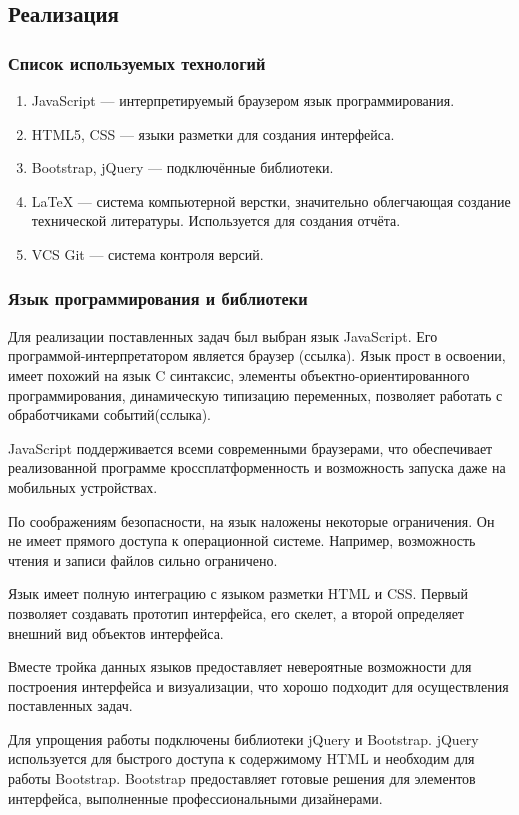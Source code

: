 \subsection{Реализация}
\subsubsection{Список используемых технологий}
\begin{enumerate}
\item JavaScript — интерпретируемый браузером язык программирования.
\item HTML5, CSS — языки разметки для создания интерфейса.
\item Bootstrap, jQuery — подключённые библиотеки.
\item LaTeX — система компьютерной верстки, значительно облегчающая создание технической литературы. Используется для создания отчёта.
\item VCS Git — система контроля версий.
\end{enumerate}
\subsubsection{Язык программирования и библиотеки}
Для реализации поставленных задач был выбран язык JavaScript. Его программой-интерпретатором является браузер (ссылка). Язык прост в освоении, имеет похожий на язык C синтаксис, элементы объектно-ориентированного программирования, динамическую типизацию переменных, позволяет работать с обработчиками событий(сслыка).

JavaScript поддерживается всеми современными браузерами, что обеспечивает реализованной программе кроссплатформенность и возможность запуска даже на мобильных устройствах.

По соображениям безопасности, на язык наложены некоторые ограничения. Он не имеет прямого доступа к операционной системе. Например, возможность чтения и записи файлов сильно ограничено.

Язык имеет полную интеграцию с языком разметки HTML и CSS. Первый позволяет создавать прототип интерфейса, его скелет, а второй определяет внешний вид объектов интерфейса.

Вместе тройка данных языков предоставляет невероятные возможности для построения интерфейса и визуализации, что хорошо подходит для осуществления поставленных задач.

Для упрощения работы подключены библиотеки jQuery и Bootstrap. jQuery используется для быстрого доступа к содержимому HTML и необходим для работы Bootstrap. Bootstrap предоставляет готовые решения для элементов интерфейса, выполненные профессиональными дизайнерами. 

